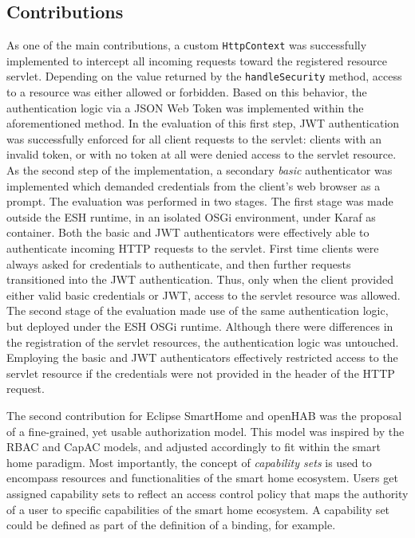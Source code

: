 \documentclass[12pt]{article}
\begin{document}
\subsection{Contributions}

As one of the main contributions, a custom \texttt{HttpContext} was successfully implemented to intercept all incoming requests toward the registered resource servlet. Depending on the value returned by the \texttt{handleSecurity} method, access to a resource was either allowed or forbidden. Based on this behavior, the authentication logic via a JSON Web Token was implemented within the aforementioned method. In the evaluation of this first step, JWT authentication was successfully enforced for all client requests to the servlet: clients with an invalid token, or with no token at all were denied access to the servlet resource. As the second step of the implementation, a secondary \emph{basic} authenticator was implemented which demanded credentials from the client's web browser as a prompt. The evaluation was performed in two stages. The first stage was made outside the ESH runtime, in an isolated OSGi environment, under Karaf as container. Both the basic and JWT authenticators were effectively able to authenticate incoming HTTP requests to the servlet. First time clients were always asked for credentials to authenticate, and then further requests transitioned into the JWT authentication. Thus, only when the client provided either valid basic credentials or JWT, access to the servlet resource was allowed. The second stage of the evaluation made use of the same authentication logic, but deployed under the ESH OSGi runtime. Although there were differences in the registration of the servlet resources, the authentication logic was untouched. Employing the basic and JWT authenticators effectively restricted access to the servlet resource if the credentials were not provided in the header of the HTTP request.

The second contribution for Eclipse SmartHome and openHAB was the proposal of a fine-grained, yet usable authorization model. This model was inspired by the RBAC and CapAC models, and adjusted accordingly to fit within the smart home paradigm. Most importantly, the concept of \emph{capability sets} is used to encompass resources and functionalities of the smart home ecosystem. Users get assigned capability sets to reflect an access control policy that maps the authority of a user to specific capabilities of the smart home ecosystem. A capability set could be defined as part of the definition of a binding, for example.
\end{document}
